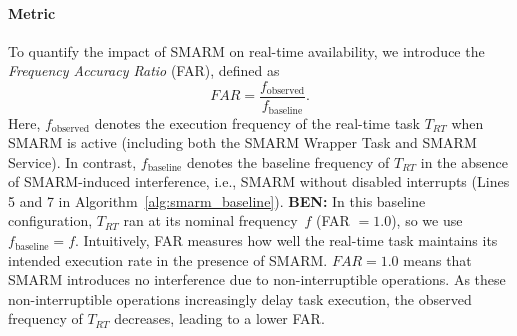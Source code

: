 \documentclass{ieeeaccess}
\DeclareRobustCommand{\ben}[1]{{\color{BENcolor}\textbf{BEN:} #1}}
\begin{document}
\paragraph{\textbf{Metric}}
To quantify the impact of SMARM on real-time availability, we 
introduce the \emph{Frequency Accuracy Ratio} (FAR), defined as
\begin{equation}
    FAR = \frac{f_{\text{observed}}}{f_{\text{baseline}}}.
\end{equation}
Here, $f_{\text{observed}}$ denotes the execution frequency of 
the real-time task $T_{RT}$ when SMARM is active (including both 
the SMARM Wrapper Task and SMARM Service).
In contrast, $f_{\text{baseline}}$ denotes the baseline frequency 
of $T_{RT}$ in the absence of SMARM-induced interference, i.e., 
SMARM without disabled interrupts (Lines 5 and 7 in 
Algorithm~\ref{alg:smarm_baseline}).
\ben{In this baseline configuration, $T_{RT}$ ran at its nominal frequency~$f$ (FAR $= 1.0$), so we use $f_{\text{baseline}} = f$.}
Intuitively, FAR measures how well the real-time task maintains 
its intended execution rate in the presence of SMARM.
$FAR = 1.0$ means that SMARM introduces no interference due to 
non-interruptible operations.
As these non-interruptible operations increasingly delay task 
execution, the observed frequency of $T_{RT}$ decreases, leading to a lower FAR.~\\

\end{document}
